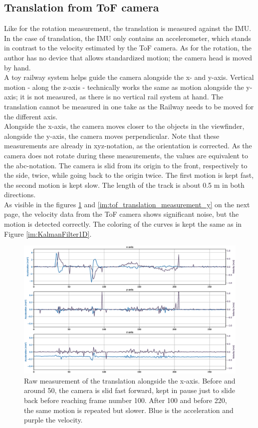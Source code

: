 \subsection{Translation from ToF camera}
\label{sec:translation_tof_rotation}
Like for the rotation measurement, the translation is measured against the IMU. In the case of translation, the IMU only contains an accelerometer, which stands in contrast to the velocity estimated by the ToF camera. As for the rotation, the author has no device that allows standardized motion; the camera head is moved by hand.\\
A toy railway system helps guide the camera alongside the x- and y-axis. Vertical motion - along the z-axis - technically works the same as motion alongside the y-axis; it is not measured, as there is no vertical rail system at hand. The translation cannot be measured in one take as the Railway needs to be moved for the different axis.\\
Alongside the x-axis, the camera moves closer to the objects in the viewfinder, alongside the y-axis, the camera moves perpendicular. Note that these measurements are already in xyz-notation, as the orientation is corrected. As the camera does not rotate during these measurements, the values are equivalent to the abc-notation. The camera is slid from its origin to the front, respectively to the side, twice, while going back to the origin twice. The first motion is kept fast, the second motion is kept slow. The length of the track is about 0.5 m in both directions.\\
As visible in the figures \ref{im:tof_translation_measurement_x} and \ref{im:tof_translation_measurement_y} on the next page, the velocity data from the ToF camera shows significant noise, but the motion is detected correctly. The coloring of the curves is kept the same as in Figure \ref{im:KalmanFilter1D}.
\begin{figure}[H]
  \centering
  \includegraphics[width=1.0\textwidth]{images/tof_translation_measurement_x.eps}
  \caption{Raw measurement of the translation alongside the x-axis. Before and around 50, the camera is slid fast forward, kept in pause just to slide back before reaching frame number 100. After 100 and before 220, the same motion is repeated but slower. Blue is the acceleration and purple the velocity.}
  \label{im:tof_translation_measurement_x}
\end{figure}
